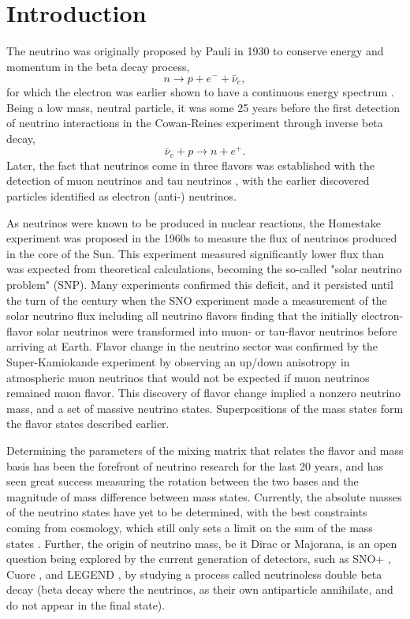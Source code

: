 \chapter{Introduction}
The neutrino was originally proposed by Pauli in 1930 \cite{pauli} to conserve energy and momentum in the beta decay process,
\begin{equation}
n \rightarrow p + e^- + \bar{\nu}_e,
\end{equation}
for which the electron was earlier shown to have a continuous energy spectrum \cite{chadwick}.
Being a low mass, neutral particle, it was some 25 years before the first detection of neutrino interactions in the Cowan-Reines experiment \cite{cowan-reines} through inverse beta decay,
\begin{equation}
\bar{\nu}_e + p \rightarrow n + e^+.
\end{equation}
Later, the fact that neutrinos come in three flavors was established with the detection of muon neutrinos \cite{danby} and tau neutrinos \cite{donut}, with the earlier discovered particles identified as electron (anti-) neutrinos.

As neutrinos were known to be produced in nuclear reactions, the Homestake experiment \cite{homestake} was proposed in the 1960s to measure the flux of neutrinos produced in the core of the Sun.
This experiment measured significantly lower flux than was expected from theoretical calculations, becoming the so-called "solar neutrino problem" (SNP).
Many experiments \cite{sage,gallex,gno} confirmed this deficit, and it persisted until the turn of the century when the SNO experiment \cite{3phase} made a measurement of the solar neutrino flux including all neutrino flavors finding that the initially electron-flavor solar neutrinos were transformed into muon- or tau-flavor neutrinos before arriving at Earth.
Flavor change in the neutrino sector was confirmed by the Super-Kamiokande \cite{superk} experiment by observing an up/down anisotropy in atmospheric muon neutrinos that would not be expected if muon neutrinos remained muon flavor.
This discovery of flavor change implied a nonzero neutrino mass, and a set of massive neutrino states.
Superpositions of the mass states form the flavor states described earlier.

Determining the parameters of the mixing matrix that relates the flavor and mass basis has been the forefront of neutrino research for the last 20 years, and has seen great success measuring the rotation between the two bases and the magnitude of mass difference between mass states. 
Currently, the absolute masses of the neutrino states have yet to be determined, with the best constraints coming from cosmology, which still only sets a limit on the sum of the mass states \cite{pdg}.
Further, the origin of neutrino mass, be it Dirac or Majorana, is an open question being explored by the current generation of detectors, such as SNO+ \cite{snop}, Cuore \cite{cuore}, and LEGEND \cite{legend}, by studying a process called neutrinoless double beta decay (beta decay where the neutrinos, as their own antiparticle annihilate, and do not appear in the final state).


